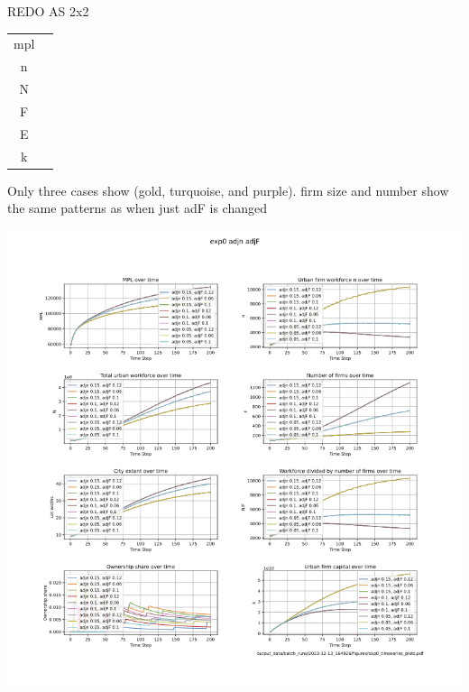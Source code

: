  REDO AS 2x2
\begin{multicols}{2}
\begin{tabular}{c|c}
  mpl  &  \\
  n   &  \\
  N   &  \\
  F   &  \\
  E   &  \\
  k   & 
\end{tabular} 
Only three cases show (gold, turquoise, and purple). firm size and number show the same patterns as when just adF is changed 
\end{multicols}

\includegraphics[scale=.55]{fig/Analysis/F-n-adjustment-speed.png}



